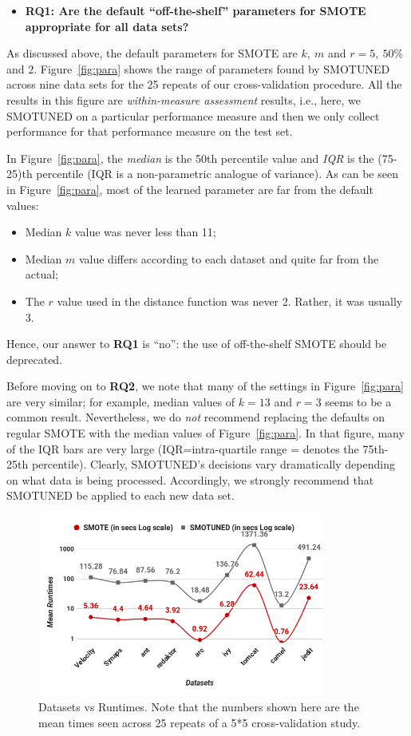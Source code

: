 \documentclass[sigconf,review, anonymous]{acmart}
\newcommand{\bi}{\begin{itemize}[leftmargin=0.4cm]}
\newcommand{\ei}{\end{itemize}}
\theoremstyle{break}
\theoremstyle{break}
\newcommand{\sma}{{\sc SMOTE}}
\newcommand{\smb}{{\sc SMOTUNED}}
\begin{document}
\bi
 \item {\bf RQ1: Are the default ``off-the-shelf'' parameters for SMOTE appropriate for all
 data sets?}
 \ei
 
 As discussed above, the default parameters for
 {\sma} are $k,\ m$ and $r = 5,\ 50\%$ and $2$.
  Figure~\ref{fig:para} shows the range of parameters
 found by {\smb} across  nine data sets for the 25 repeats of our cross-validation procedure.
 All the results in this figure are {\em within-measure assessment} results, i.e.,
 here, we {\smb}  on a particular performance measure and then we only collect performance for that performance measure on the test set.
 
 
 In  Figure~\ref{fig:para}, the {\em median} is the 50th percentile
 value and {\em IQR} is the (75-25)th percentile
 (IQR is a non-parametric analogue of variance).
 As can be seen in Figure~\ref{fig:para}, most of the learned parameter are far from the default values:
 \bi
 \item 
 Median $k$ value was never less than 11;
 \item
 Median $m$ value differs according to each dataset and quite far from the actual;
 \item
 The $r$ value used in the distance function was never 2. Rather, it was usually 3.
 \ei
 Hence,  our answer to {\bf RQ1} is ``no'': the use of off-the-shelf {\sma} should be deprecated. 
 
 Before moving on to {\bf RQ2}, we note that many of the settings in Figure~\ref{fig:para} are very similar; for example, median values of $k=13$ and $r=3$ seems to be a common
result.  Nevertheless, we do {\em not} recommend replacing
the defaults on regular {\sma} with the median values
of Figure~\ref{fig:para}. In that figure, many of the  IQR bars are
very large (IQR=intra-quartile range = denotes the
75th-25th percentile). Clearly, SMOTUNED's decisions vary dramatically
depending on what data  is being processed.  Accordingly,
we strongly recommend that {\smb} be applied to each new data set.

\begin{figure}[!t]
  \centering
\includegraphics[width=\linewidth,height=6cm,keepaspectratio]{./fig/runtimes.png}
  \caption{Datasets vs Runtimes. Note that the numbers
  shown here are the mean times seen across 25 repeats of a 5*5 cross-validation study.
  }
  \label{runtime}
\end{figure}
\end{document}
